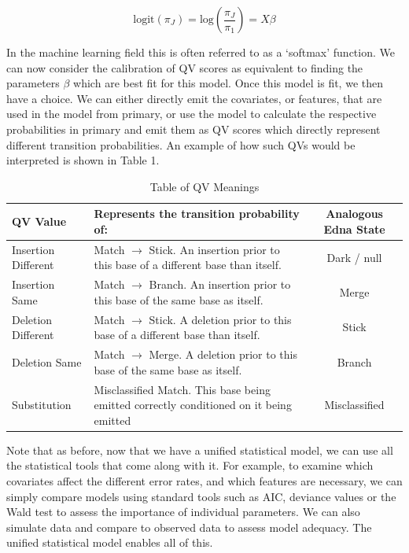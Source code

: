 \documentclass[fleqn,10pt]{SelfArx} %
\begin{document}
\begin{dmath}
\text{logit} (\pi_{J}) = \text{log} ( \frac{\pi_{J}}{\pi_{1}}) = X \beta
\end{dmath}

In the machine learning field this is often referred to as a `softmax' function.  We can now consider the calibration of QV scores as equivalent to finding the parameters $\beta$ which are best fit for this model.  Once this model is fit, we then have a choice.  We can either directly emit the covariates, or features, that are used in the model from primary, or use the model to calculate the respective probabilities in primary and emit them as QV scores which directly represent different transition probabilities.  An example of how such QVs would be interpreted is shown in Table 1.  

\begin{table}[]
\caption{Table of QV Meanings}
\centering
    \begin{tabular}{| l | p{7cm} | c |  }
    \toprule
    \hline
    \textbf{QV Value} &  \textbf{Represents the transition probability of:} &   \textbf{Analogous Edna State}  \\ \hline \hline
    Insertion Different & Match $\rightarrow$ Stick.  An insertion prior to this base of a different base than itself. &  Dark / null \\ \hline
    Insertion Same & Match $\rightarrow$ Branch. An insertion prior to this base of the same base as itself.&  Merge \\ \hline
    Deletion Different & Match $\rightarrow$ Stick. A deletion prior to this base of a different base than itself. &  Stick \\ \hline
    Deletion Same & Match $\rightarrow$ Merge. A deletion prior to this base of the same base as itself. &  Branch \\ \hline
    Substitution & Misclassified Match. This base being emitted correctly conditioned on it being emitted &   Misclassified \\ \hline
    \bottomrule
    \end{tabular}
\end{table}

Note that as before, now that we have a unified statistical model, we can use all the statistical tools that come along with it.  For example, to examine which covariates affect the different error rates, and which features are necessary, we can simply compare models using standard tools such as AIC, deviance values or the Wald test to assess the importance of individual parameters.  We can also simulate data and compare to observed data to assess model adequacy.  The unified statistical model enables all of this.
\end{document}
